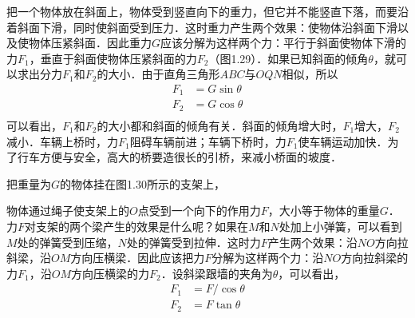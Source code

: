 把一个物体放在斜面上，物体受到竖直向下的重力，但它并不能竖直下落，而要沿着斜面下滑，同时使斜面受到压力．这时重力产生两个效果：使物体沿斜面下滑以及使物体压紧斜面．因此重力$G$应该分解为这样两个力：平行于斜面使物体下滑的力$F_1$，垂直于斜面使物体压紧斜面的力$F_2$（图1.29）．如果已知斜面的倾角$\theta$，就可以求出分力$F_1$和$F_2$的大小．由于直角三角形$ABC$与$OQN$相似，所以
\begin{equation*}
    \begin{aligned}
        F_1 & = G\sin\theta \\
        F_2 & = G\cos\theta \\
    \end{aligned}
\end{equation*}
可以看出，$F_1$和$F_2$的大小都和斜面的倾角有关．斜面的倾角增大时，$F_1$增大，$F_2$减小．车辆上桥时，力$F_1$阻碍车辆前进；车辆下桥时，力$F_1$使车辆运动加快．为了行车方便与安全，高大的桥要造很长的引桥，来减小桥面的坡度．

把重量为$G$的物体挂在图1.30所示的支架上，
\begin{figure}[H]
    \centering
    \caption{}
\end{figure}
物体通过绳子使支架上的$O$点受到一个向下的作用力$F$，大小等于物体的重量$G$．力$F$对支架的两个梁产生的效果是什么呢？如果在$M$和$N$处加上小弹簧，可以看到$M$处的弹簧受到压缩，$N$处的弹簧受到拉伸．这时力$F$产生两个效果：沿$NO$方向拉斜梁，沿$OM$方向压横梁．因此应该把力$F$分解为这样两个力：沿$NO$方向拉斜梁的力$F_1$，沿$OM$方向压横梁的力$F_2$．设斜梁跟墙的夹角为$\theta$，可以看出，
\begin{equation*}
    \begin{aligned}
        F_1 & = F/\cos\theta \\
        F_2 & = F\tan\theta  \\
    \end{aligned}
\end{equation*}

